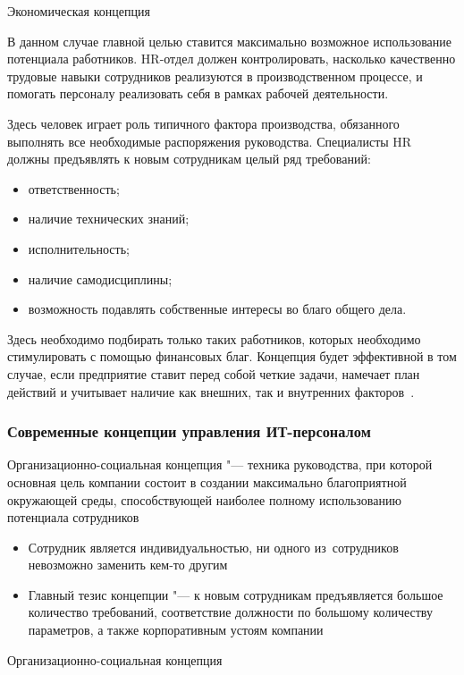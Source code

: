 \documentclass{../industrial-development}
\begin{document}
\lecturenotes

\alert{Экономическая концепция}

В данном случае главной целью ставится максимально возможное использование потенциала работников. HR-отдел должен контролировать, насколько качественно трудовые навыки сотрудников реализуются в производственном процессе, и помогать персоналу реализовать себя в рамках рабочей деятельности.

Здесь человек играет роль типичного фактора производства, обязанного выполнять все необходимые распоряжения руководства. Специалисты HR должны предъявлять к новым сотрудникам целый ряд требований:
\begin{itemize}
\item ответственность;
\item	наличие технических знаний;
\item	исполнительность;
\item	наличие самодисциплины;
\item	возможность подавлять собственные интересы во благо общего дела.
\end{itemize}

Здесь необходимо подбирать только таких работников, которых необходимо стимулировать с помощью финансовых благ. Концепция будет эффективной в том случае, если предприятие ставит перед собой четкие задачи, намечает план действий и учитывает наличие как внешних, так и внутренних факторов~\cite{Sovrconcept}. 

\begin{frame} \frametitle{Современные концепции управления ИТ-персоналом}
 \alert{Организационно-социальная концепция} "--- техника руководства, при которой основная цель компании состоит в создании максимально благоприятной окружающей среды, способствующей наиболее полному использованию потенциала сотрудников
		  \begin{itemize}
			\item Сотрудник является индивидуальностью, ни одного из~сотрудников невозможно заменить кем-то другим
		\item Главный тезис концепции "---  к новым сотрудникам предъявляется большое количество требований, соответствие должности по большому количеству параметров, а также корпоративным устоям компании
		  \end{itemize}
\end{frame}

\lecturenotes

\alert{Организационно-социальная концепция}
\end{document}
